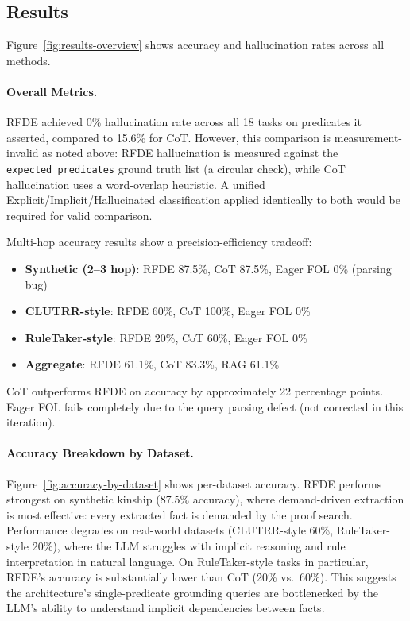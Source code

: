 \documentclass[11pt,letterpaper]{article}
\begin{document}
\subsection{Results}

Figure~\ref{fig:results-overview} shows accuracy and hallucination rates across all methods.

\paragraph{Overall Metrics.}
RFDE achieved 0\% hallucination rate across all 18 tasks on predicates it asserted, compared
to 15.6\% for CoT. However, this comparison is measurement-invalid as noted above: RFDE
hallucination is measured against the \texttt{expected\_predicates} ground truth list (a
circular check), while CoT hallucination uses a word-overlap heuristic. A unified
Explicit/Implicit/Hallucinated classification applied identically to both would be required
for valid comparison.

Multi-hop accuracy results show a precision-efficiency tradeoff:
\begin{itemize}
  \item \textbf{Synthetic (2--3 hop)}: RFDE 87.5\%, CoT 87.5\%, Eager FOL 0\% (parsing bug)
  \item \textbf{CLUTRR-style}: RFDE 60\%, CoT 100\%, Eager FOL 0\%
  \item \textbf{RuleTaker-style}: RFDE 20\%, CoT 60\%, Eager FOL 0\%
  \item \textbf{Aggregate}: RFDE 61.1\%, CoT 83.3\%, RAG 61.1\%
\end{itemize}

CoT outperforms RFDE on accuracy by approximately 22 percentage points. Eager FOL fails
completely due to the query parsing defect (not corrected in this iteration).

\paragraph{Accuracy Breakdown by Dataset.}

Figure~\ref{fig:accuracy-by-dataset} shows per-dataset accuracy. RFDE performs strongest on
synthetic kinship (87.5\% accuracy), where demand-driven extraction is most effective: every
extracted fact is demanded by the proof search. Performance degrades on real-world datasets
(CLUTRR-style 60\%, RuleTaker-style 20\%), where the LLM struggles with implicit reasoning
and rule interpretation in natural language. On RuleTaker-style tasks in particular, RFDE's
accuracy is substantially lower than CoT (20\% vs.\ 60\%). This suggests the architecture's
single-predicate grounding queries are bottlenecked by the LLM's ability to understand
implicit dependencies between facts.
\end{document}

